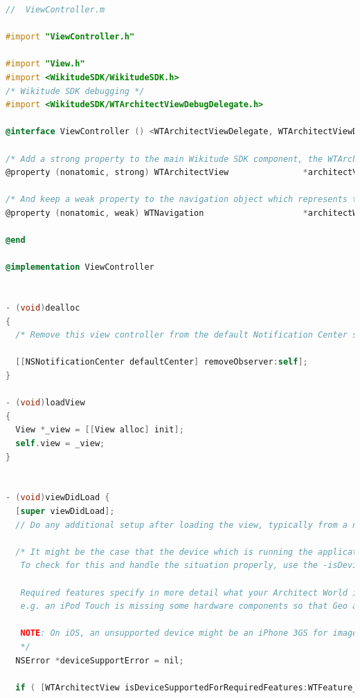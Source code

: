 \documentclass[thesis=M,english]{FITthesis}[2012/10/20]
\begin{document}
\begin{lstlisting}[language=C]
//  ViewController.m

#import "ViewController.h"

#import "View.h"
#import <WikitudeSDK/WikitudeSDK.h>
/* Wikitude SDK debugging */
#import <WikitudeSDK/WTArchitectViewDebugDelegate.h>

@interface ViewController () <WTArchitectViewDelegate, WTArchitectViewDebugDelegate>

/* Add a strong property to the main Wikitude SDK component, the WTArchitectView */
@property (nonatomic, strong) WTArchitectView               *architectView;

/* And keep a weak property to the navigation object which represents the loading status of your Architect World */
@property (nonatomic, weak) WTNavigation                    *architectWorldNavigation;

@end

@implementation ViewController


- (void)dealloc
{
  /* Remove this view controller from the default Notification Center so that it can be released properly */
  
  [[NSNotificationCenter defaultCenter] removeObserver:self];
}

- (void)loadView
{
  View *_view = [[View alloc] init];
  self.view = _view;
}


- (void)viewDidLoad {
  [super viewDidLoad];
  // Do any additional setup after loading the view, typically from a nib.
  
  /* It might be the case that the device which is running the application does not fulfil all Wikitude SDK hardware requirements.
   To check for this and handle the situation properly, use the -isDeviceSupportedForRequiredFeatures:error class method.
   
   Required features specify in more detail what your Architect World intends to do. Depending on your intentions, more or less devices might be supported.
   e.g. an iPod Touch is missing some hardware components so that Geo augmented reality does not work, but 2D tracking does.
   
   NOTE: On iOS, an unsupported device might be an iPhone 3GS for image recognition or an iPod Touch 4th generation for Geo augmented reality.
   */
  NSError *deviceSupportError = nil;

  if ( [WTArchitectView isDeviceSupportedForRequiredFeatures:WTFeature_Geo error:&deviceSupportError] ) {
    

\end{lstlisting}
\end{document}
